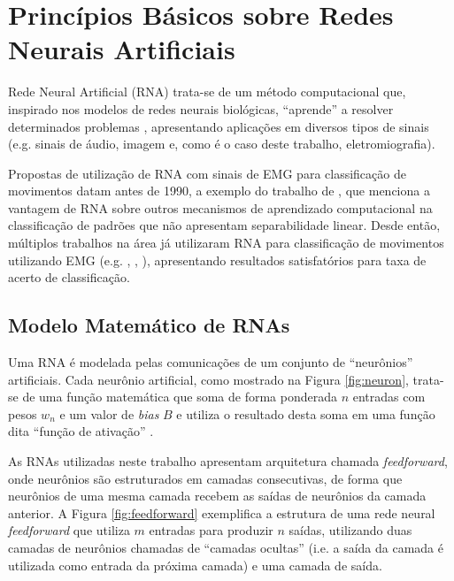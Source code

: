 		\section{Princípios Básicos sobre Redes Neurais Artificiais}
Rede Neural Artificial (RNA) trata-se de um método computacional que, inspirado nos modelos de redes neurais biológicas, ``aprende'' a resolver determinados problemas \cite{YEGNANARAYANA2009}, apresentando aplicações em diversos tipos de sinais (e.g. sinais de áudio, imagem e, como é o caso deste trabalho, eletromiografia).

Propostas de utilização de RNA com sinais de EMG para classificação de movimentos datam antes de 1990, a exemplo do trabalho de \cite{Hiraiwa1989}, que menciona a vantagem de RNA sobre outros mecanismos de aprendizado computacional na classificação de padrões que não apresentam separabilidade linear. Desde então, múltiplos trabalhos na área já utilizaram RNA para classificação de movimentos utilizando EMG (e.g. \cite{Hudgins1993}, \cite{Subasi2006}, \cite{Bu2003}), apresentando resultados satisfatórios para taxa de acerto de classificação.

			\subsection{Modelo Matemático de RNAs}

Uma RNA é modelada pelas comunicações de um conjunto de ``neurônios'' artificiais. Cada neurônio artificial, como mostrado na Figura \ref{fig:neuron}, trata-se de uma função matemática que soma de forma ponderada $n$ entradas com pesos $w_n$ e um valor de \emph{bias} $B$ e utiliza o resultado desta soma em uma função dita ``função de ativação'' \cite{Tanikic2012}.



As RNAs utilizadas neste trabalho apresentam arquitetura chamada \emph{feedforward}, onde neurônios são estruturados em camadas consecutivas, de forma que neurônios de uma mesma camada recebem as saídas de neurônios da camada anterior. A Figura \ref{fig:feedforward} exemplifica a estrutura de uma rede neural \emph{feedforward} que utiliza $m$ entradas para produzir $n$ saídas, utilizando duas camadas de neurônios chamadas de ``camadas ocultas'' (i.e. a saída da camada é utilizada como entrada da próxima camada) e uma camada de saída.

